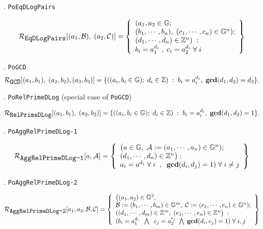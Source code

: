 \documentclass[11pt, lettersize, notitlepage, leqno, footskip=0.6cm]{article}
\newcommand{\bz}{\mathbb Z}
\newcommand{\mc}{\mathcal}
\newcommand{\mb}{\mathbb}
\newcommand{\mbf}{\mathbf}
\newcommand{\noin}{\noindent}
\newcommand{\GCD}{\mbf{gcd}}
\numberwithin{equation}{section}
\begin{document}
{\noin 7. \verb|PoEqDLogPairs| \vspace{-0.3cm}

\[
  \mc{R}_{{\protect\verb|EqDLogPairs|}}[(a_1, \mc{B}),\; (a_2, \mc{C})] = \left\{\begin{array}{l}
  	(a_1,a_2\in\mb{G};\\
    (b_1,\cdots, b_n),\;(c_1,\cdots, c_n)\in\mb{G}^n);\\
    (d_1,\cdots,d_n)\in \bz^n)\;: \\
    b_i = a_1^{d_i}\;,\;c_i= a_2^{d_i} \;\forall\; i
  \end{array}\right\}
\]

\noin 8. \verb|PoGCD| \vspace{-0.2cm}
$$\mc{R}_{{\protect\verb|GCD|}}[(a_1,b_1),\; (a_2,b_2),(a_3,b_3)] = \{((a_i, b_i\in\mb{G});\;d_i\in\bz)\;:\; b_i = a_i^{d_i},\;\GCD(d_1,d_2)=d_3  \} .$$


\noin 9. \verb|PoRelPrimeDLog| (special case of \verb|PoGCD|) \vspace{-0.7cm}

\[
\mc{R}_{{\protect\verb|RelPrimeDLog|}}[(a_1,b_1),\;(a_2,b_2)] = \{((a_i, b_i\in\mb{G});\;d_i\in\bz)\;:\; b_i = a_i^{d_i},\;\GCD(d_1,d_2)=1 \} .
\]

\noin 10. \verb|PoAggRelPrimeDLog-1| \vspace{-0.2cm}

\[
  \mc{R}_{{\protect\verb|AggRelPrimeDLog-1|}}[a, \mc{A}] = \left\{\begin{array}{l}
    \big(a\in\mb{G},\;  \mc{A}:=(a_1,\cdots, a_n)\in\mb{G}^n);\\
    (d_1,\cdots,d_n)\in\bz^n\big): \\
    a_i = a^{d_i}\;\forall\;i\;\;,\;\; \GCD(d_i, d_j) = 1)\;\forall \;i\neq j   	
  \end{array}\right\}
\] 

\noin 11. \verb|PoAggRelPrimeDLog-2| \vspace{-0.6cm}

\[
  \mc{R}_{{\protect\verb|AggRelPrimeDLog-2|}}[a_1, a_2, \mc{B}, \mc{C}] = \left\{\begin{array}{l}
    \big((a_1,a_2)\in\mb{G}^2,\;\\
     \mc{B}:=(b_1,\cdots, b_m)\in\mb{G}^m,\;\mc{C}:= (c_1,\cdots, c_n)\in\mb{G}^n);\\
    ((d_1,\cdots,d_m)\in\bz^m,\; (e_1,\cdots,e_n)\in\bz^n\big)\;: \\
    (b_i = a_1^{d_i}\;\;\bigwedge\;\; c_j = a_2^{e_j}\;\bigwedge\; \GCD(d_i, e_j) = 1)\;\forall \;i,j   	
  \end{array}\right\}
\] 

}
\end{document}
